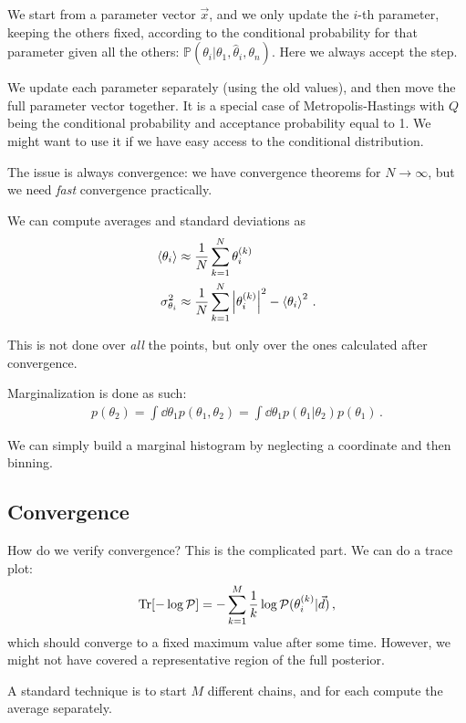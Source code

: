 \documentclass[main.tex]{subfiles}
\begin{document}
We start from a parameter vector \(\vec{x}\), and we only update the \(i\)-th parameter, keeping the others fixed, according to the conditional probability for that parameter given all the others: \(\mathbb{P}(\theta _i | \theta_1 , \hat{\theta}_i, \theta _n)\). 
Here we always accept the step. 

We update each parameter separately (using the old values), and then move the full parameter vector together. 
It is a special case of Metropolis-Hastings with \(Q\) being the conditional probability and acceptance probability equal to 1. 
We might want to use it if we have easy access to the conditional distribution. 

The issue is always convergence: we have convergence theorems for \(N \to \infty \), but we need \emph{fast} convergence practically. 

We can compute averages and standard deviations as 
%
\begin{align}
\expval{\theta _i} &\approx \frac{1}{N} \sum _{k=1}^{N} \theta^{(k)}_i  \\
\sigma^2_{\theta _i} &\approx \frac{1}{N} \sum _{k=1}^{N} \abs{\theta^{(k)}_i}^2 - \expval{\theta _i}^2
\,.
\end{align}

This is not done over \emph{all} the points, but only over the ones calculated after convergence. 

Marginalization is done as such: 
%
\begin{align}
p(\theta_2) = \int \dd{\theta _1} p(\theta_1 , \theta _2 ) 
= \int \dd{\theta _1} p(\theta_1 | \theta _2) p(\theta_1 )
\,.
\end{align}

We can simply build a marginal histogram by neglecting a coordinate and then binning. 

\subsection{Convergence}

How do we verify convergence? This is the complicated part.
We can do a trace plot: 
%
\begin{align}
\Tr[ - \log \mathcal{P}] = - \sum _{k=1}^{M} \frac{1}{k} \log \mathcal{P}(\theta^{(k)}_i | \vec{d})
\,,
\end{align}
%
which should converge to a fixed maximum value after some time. 
However, we might not have covered a representative region of the full posterior. 

A standard technique is to start \(M\) different chains, and for each compute the average separately. 
\end{document}

